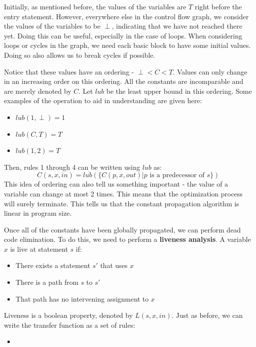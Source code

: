 \documentclass[12pt,letterpaper]{book}
\theoremstyle{definition}
\begin{document}
Initially, as mentioned before, the values of the variables are $T$ right before the entry statement. However, everywhere else in the control flow graph, we consider the values of the variables to be $\perp$, indicating that we have not reached there yet. Doing this can be useful, especially in the case of loops. When considering loops or cycles in the graph, we need each basic block to have some initial values. Doing so also allows us to break cycles if possible.

Notice that these values have an ordering - $\perp < C < T$. Values can only change in an increasing order on this ordering. All the constants are incomparable and are merely denoted by $C$. Let $lub$ be the least upper bound in this ordering. Some examples of the operation to aid in understanding are given here:
\begin{itemize}
  \item $lub(1, \perp) = 1$
  \item $lub(C,T) = T$
  \item $lub(1,2) = T$
\end{itemize}
Then, rules 1 through 4 can be written using $lub$ as:
\[C(s,x,in) = lub( \{ C(p,x,out) | p \text{ is a predecessor of }s\} )\]
This idea of ordering can also tell us something important - the value of a variable can change at most 2 times. This means that the optimization process will surely terminate. This tells us that the constant propagation algorithm is linear in program size.

Once all of the constants have been globally propagated, we can perform dead code elimination. To do this, we need to perform a \textbf{liveness analysis}. A variable $x$ is live at statement $s$ if:
\begin{itemize}
  \item There exists a statement $s'$ that uses $x$
  \item There is a path from $s$ to $s'$
  \item That path has no intervening assignment to $x$
\end{itemize}
Liveness is a boolean property, denoted by $L(s,x,in)$. Just as before, we can write the transfer function as a set of rules:
\begin{itemize}
  \item 
\end{itemize}
\end{document}
